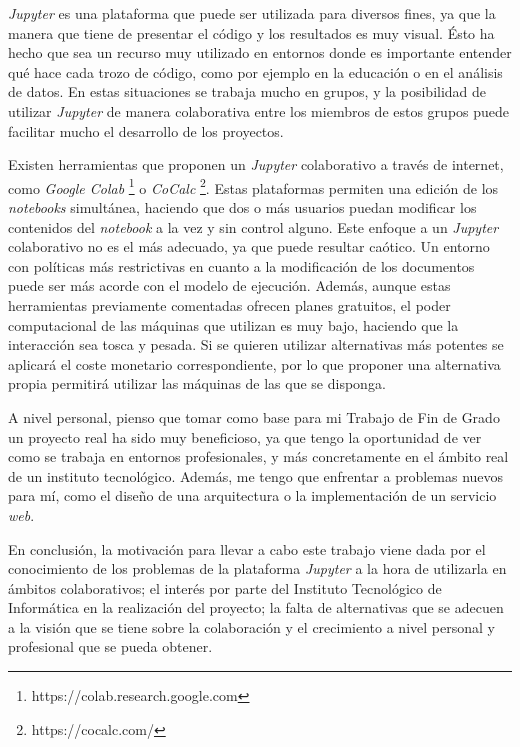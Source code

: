 \documentclass[11pt,spanish,listoffigures]{tfgetsinf}
\begin{document}
\textit{Jupyter} es una plataforma que puede ser utilizada para diversos fines, ya que la manera que tiene de presentar el código y los resultados es muy visual. Ésto ha hecho que sea un recurso muy utilizado en entornos donde es importante entender qué hace cada trozo de código, como por ejemplo en la educación o en el análisis de datos. En estas situaciones se trabaja mucho en grupos, y la posibilidad de utilizar \textit{Jupyter} de manera colaborativa entre los miembros de estos grupos puede facilitar mucho el desarrollo de los proyectos.

Existen herramientas que proponen un \textit{Jupyter} colaborativo a través de internet, como \textit{Google Colab} \footnote{https://colab.research.google.com} o \textit{CoCalc} \footnote{https://cocalc.com/}. Estas plataformas permiten una edición de los \textit{notebooks} simultánea, haciendo que dos o más usuarios puedan modificar los contenidos del \textit{notebook} a la vez y sin control alguno. Este enfoque a un \textit{Jupyter} colaborativo no es el más adecuado, ya que puede resultar caótico. Un entorno con políticas más restrictivas en cuanto a la modificación de los documentos puede ser más acorde con el modelo de ejecución. Además, aunque estas herramientas previamente comentadas ofrecen planes gratuitos, el poder computacional de las máquinas que utilizan es muy bajo, haciendo que la interacción sea tosca y pesada. Si se quieren utilizar alternativas más potentes se aplicará el coste monetario correspondiente, por lo que proponer una alternativa propia permitirá utilizar las máquinas de las que se disponga.

A nivel personal, pienso que tomar como base para mi Trabajo de Fin de Grado un proyecto real ha sido muy beneficioso, ya que tengo la oportunidad de ver como se trabaja en entornos profesionales, y más concretamente en el ámbito real de un instituto tecnológico. Además, me tengo que enfrentar a problemas nuevos para mí, como el diseño de una arquitectura o la implementación de un servicio \textit{web}. 

En conclusión, la motivación para llevar a cabo este trabajo viene dada por el conocimiento de los problemas de la plataforma \textit{Jupyter} a la hora de utilizarla en ámbitos colaborativos; el interés por parte del Instituto Tecnológico de Informática en la realización del proyecto; la falta de alternativas que se adecuen a la visión que se tiene sobre la colaboración y el crecimiento a nivel personal y profesional que se pueda obtener.  
\end{document}
